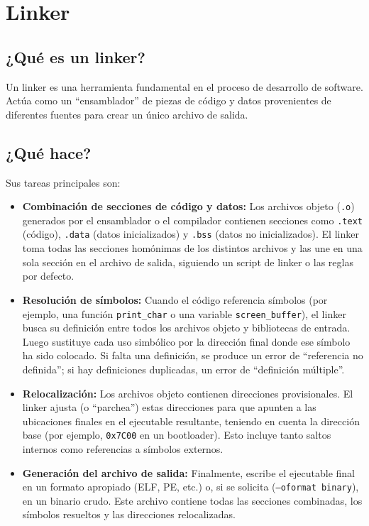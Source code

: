 \section{Linker}

\subsection{¿Qué es un linker?}
Un linker es una herramienta fundamental en el proceso de desarrollo de software. Actúa como un “ensamblador” de piezas de código y datos provenientes de diferentes fuentes para crear un único archivo de salida.

\subsection{¿Qué hace?}
Sus tareas principales son:

\begin{itemize}[noitemsep]
  \item \textbf{Combinación de secciones de código y datos:} Los archivos objeto (\texttt{.o}) generados por el ensamblador o el compilador contienen secciones como \texttt{.text} (código), \texttt{.data} (datos inicializados) y \texttt{.bss} (datos no inicializados). El linker toma todas las secciones homónimas de los distintos archivos y las une en una sola sección en el archivo de salida, siguiendo un script de linker o las reglas por defecto.
  
  \item \textbf{Resolución de símbolos:} Cuando el código referencia símbolos (por ejemplo, una función \texttt{print\_char} o una variable \texttt{screen\_buffer}), el linker busca su definición entre todos los archivos objeto y bibliotecas de entrada. Luego sustituye cada uso simbólico por la dirección final donde ese símbolo ha sido colocado. Si falta una definición, se produce un error de “referencia no definida”; si hay definiciones duplicadas, un error de “definición múltiple”.

  \item \textbf{Relocalización:} Los archivos objeto contienen direcciones provisionales. El linker ajusta (o “parchea”) estas direcciones para que apunten a las ubicaciones finales en el ejecutable resultante, teniendo en cuenta la dirección base (por ejemplo, \texttt{0x7C00} en un bootloader). Esto incluye tanto saltos internos como referencias a símbolos externos.

  \item \textbf{Generación del archivo de salida:} Finalmente, escribe el ejecutable final en un formato apropiado (ELF, PE, etc.) o, si se solicita (\texttt{--oformat binary}), en un binario crudo. Este archivo contiene todas las secciones combinadas, los símbolos resueltos y las direcciones relocalizadas.
\end{itemize}

